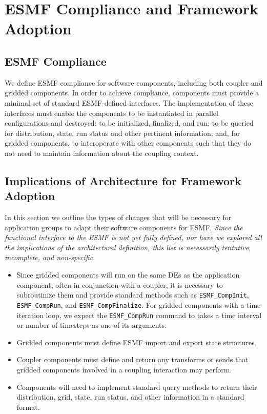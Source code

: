 \section{ESMF Compliance and Framework Adoption}
\label{sec:implications}

\subsection{ESMF Compliance}

We define ESMF compliance for software components, including
both coupler and gridded components.  In order to achieve compliance, 
components must provide a minimal set of standard ESMF-defined 
interfaces.  The implementation of these interfaces must enable the  
components to be instantiated in parallel configurations
and destroyed; to be initialized, finalized, and run; to be queried for 
distribution, state, run status and other pertinent information;
and, for gridded components, to interoperate with other components such
that they do not need to maintain information about the coupling context.

\subsection{Implications of Architecture for Framework Adoption}

In this section we outline the types of changes that will be necessary for
application groups to adapt their software components for ESMF.  {\it Since the
functional interface to the ESMF is not yet fully defined, nor have we 
explored all the implications of the architectural definition, this list is 
necessarily tentative, incomplete, and non-specific.}

\begin{itemize}
\item Since gridded components will run on the same 
DEs as the application component, often in conjunction with a coupler, 
it is necessary to subroutinize
them and provide standard methods such as {\tt ESMF\_CompInit}, 
{\tt ESMF\_CompRun}, and {\tt ESMF\_CompFinalize}.  For gridded components
with a time iteration loop, we expect the {\tt ESMF\_CompRun} command to 
takes a time interval or number of timesteps as one of its arguments.
\item Gridded components must define ESMF import and export state 
structures.
\item Coupler components must define and return any transforms or 
sends that gridded components involved in a coupling interaction may 
perform.
\item Components will need to implement standard query methods to return
their distribution, grid, state, run status, and other information in
a standard format.
\end{itemize}

